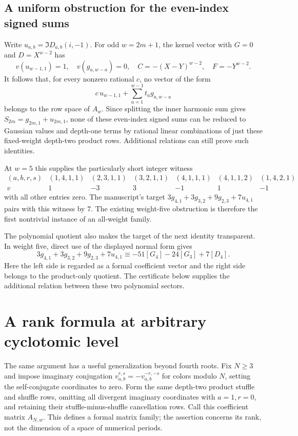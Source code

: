 \documentclass[11pt]{article}
\numberwithin{equation}{section}
\theoremstyle{plain}
\theoremstyle{definition}
\theoremstyle{remark}
\begin{document}
\subsection{A uniform obstruction for the even-index signed sums}
Write $u_{a,b}=\Im D_{a,b}(i,-1)$. For odd $w=2m+1$, the kernel vector
with $G=0$ and $D=X^{w-2}$ has
\[
 v(u_{w-1,1})=1,\quad v(g_{a,w-a})=0,\quad
 C=-(X-Y)^{w-2},\quad F=-Y^{w-2}.
\]
It follows that, for every nonzero rational $c$, no vector of the form
\[
 c\,u_{w-1,1}+\sum_{a=1}^{w-1}t_ag_{a,w-a}
\]
belongs to the row space of $A_w$. Since splitting the inner harmonic
sum gives $S_{2m}=g_{2m,1}+u_{2m,1}$, none of these even-index signed
sums can be reduced to Gaussian values and depth-one terms by rational
linear combinations of just these fixed-weight depth-two product rows.
Additional relations can still prove such identities.

At $w=5$ this supplies the particularly short integer witness
\[
\begin{array}{c|rrrrrr}
(a,b,r,s)&(1,4,1,1)&(2,3,1,1)&(3,2,1,1)&(4,1,1,1)&(4,1,1,2)&(1,4,2,1)\\\hline
v&1&-3&3&-1&1&-1
\end{array}
\]
with all other entries zero. The manuscript's target
$3g_{4,1}+3g_{3,2}+9g_{2,3}+7u_{4,1}$ pairs with this witness by $7$.
The existing weight-five obstruction is therefore the first nontrivial
instance of an all-weight family.


The polynomial quotient also makes the target of the next identity
transparent. In weight five, direct use of the displayed normal form gives
\begin{equation}\label{eq:S4-quotient}
 3g_{4,1}+3g_{3,2}+9g_{2,3}+7u_{4,1}
 \equiv -51[G_4]-24[G_3]+7[D_4].
\end{equation}
Here the left side is regarded as a formal coefficient vector and the
right side belongs to the product-only quotient. The certificate below
supplies the additional relation between these two polynomial sectors.

\section{A rank formula at arbitrary cyclotomic level}
The same argument has a useful generalization beyond fourth roots.
Fix $N\ge3$ and impose imaginary conjugation
$v^{r,s}_{a,b}=-v^{-r,-s}_{a,b}$ for colors modulo $N$, setting the
self-conjugate coordinates to zero. Form the same depth-two product
stuffle and shuffle rows, omitting all divergent imaginary coordinates
with $a=1,r=0$, and retaining their stuffle-minus-shuffle cancellation
rows. Call this coefficient matrix $A_{N,w}$. This defines a formal
matrix family; the assertion concerns its rank, not the dimension of
a space of numerical periods.
\end{document}

